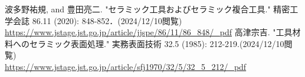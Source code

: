\begin{thebibliography}{99}
     波多野祐規, and 豊田亮二. "セラミック工具およびセラミック複合工具." 精密工学会誌 86.11 (2020): 848-852．(2024/12/10閲覧)\\
    \url{https://www.jstage.jst.go.jp/article/jjspe/86/11/86_848/_pdf}
     高津宗吉. "工具材料へのセラミック表面処理." 実務表面技術 32.5 (1985): 212-219.(2024/12/10閲覧)\\
    \url{https://www.jstage.jst.go.jp/article/sfj1970/32/5/32_5_212/_pdf}
\end{thebibliography}

